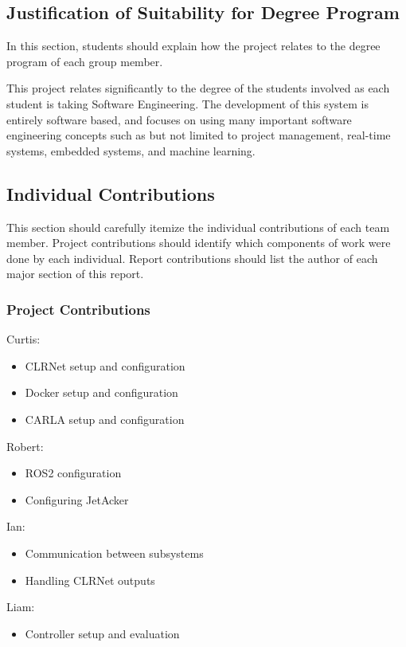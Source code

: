 \documentclass[titlepage,draft]{article}
\begin{document}
\subsection{Justification of Suitability for Degree Program}
In this section, students should explain how the project
relates to the degree program of each group member.

This project relates significantly to the degree of the students involved as each student is taking Software Engineering. The development of this system is entirely software based, and focuses on using many important software engineering concepts such as but not limited to project management, real-time systems, embedded systems, and machine learning.


\subsection{Individual Contributions}
This section should carefully itemize the individual contributions of each team member. Project contributions should identify which components of work were done by each  individual. Report contributions should list the author of  each major section of this report.

\subsubsection{Project Contributions}

Curtis:
\begin{itemize}
	\item CLRNet setup and configuration
	\item Docker setup and configuration
	\item CARLA setup and configuration
\end{itemize}

Robert:
\begin{itemize}
	\item ROS2 configuration
	\item Configuring JetAcker
\end{itemize}

Ian:
\begin{itemize}
	\item Communication between subsystems
	\item Handling CLRNet outputs
\end{itemize}

Liam:
\begin{itemize}
	\item Controller setup and evaluation
\end{itemize}
\end{document}
